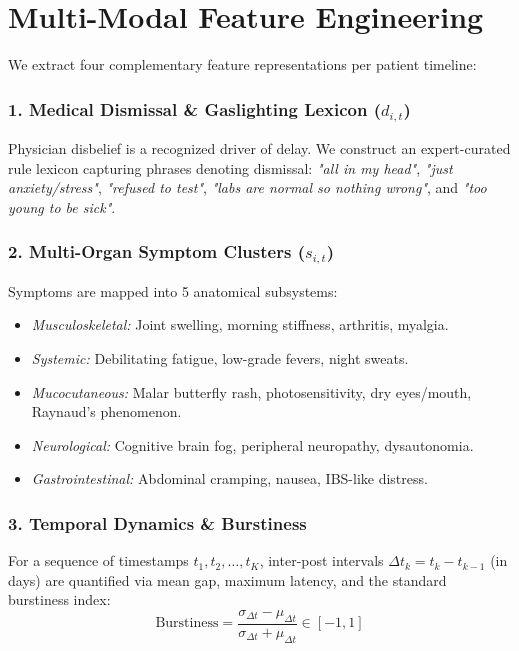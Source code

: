\documentclass[runningheads]{llncs}
\begin{document}
\section{Multi-Modal Feature Engineering}
\label{sec:features}

We extract four complementary feature representations per patient timeline:

\subsubsection{1. Medical Dismissal \& Gaslighting Lexicon ($d_{i,t}$)}
Physician disbelief is a recognized driver of delay. We construct an expert-curated rule lexicon capturing phrases denoting dismissal: \emph{"all in my head"}, \emph{"just anxiety/stress"}, \emph{"refused to test"}, \emph{"labs are normal so nothing wrong"}, and \emph{"too young to be sick"}.

\subsubsection{2. Multi-Organ Symptom Clusters ($s_{i,t}$)}
Symptoms are mapped into 5 anatomical subsystems:
\begin{itemize}
    \item \emph{Musculoskeletal:} Joint swelling, morning stiffness, arthritis, myalgia.
    \item \emph{Systemic:} Debilitating fatigue, low-grade fevers, night sweats.
    \item \emph{Mucocutaneous:} Malar butterfly rash, photosensitivity, dry eyes/mouth, Raynaud's phenomenon.
    \item \emph{Neurological:} Cognitive brain fog, peripheral neuropathy, dysautonomia.
    \item \emph{Gastrointestinal:} Abdominal cramping, nausea, IBS-like distress.
\end{itemize}

\subsubsection{3. Temporal Dynamics \& Burstiness}
For a sequence of timestamps $t_1, t_2, \dots, t_K$, inter-post intervals $\Delta t_k = t_k - t_{k-1}$ (in days) are quantified via mean gap, maximum latency, and the standard burstiness index:
\[
\text{Burstiness} = \frac{\sigma_{\Delta t} - \mu_{\Delta t}}{\sigma_{\Delta t} + \mu_{\Delta t}} \in [-1, 1]
\]
\end{document}
